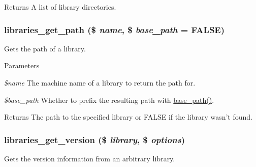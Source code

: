 \begin{DoxyReturn}{Returns}
A list of library directories. 
\end{DoxyReturn}
\hypertarget{libraries_8module_af6582ffdd6b230b9532c8fd007448b2e}{
\subsubsection[{libraries\_\-get\_\-path}]{\setlength{\rightskip}{0pt plus 5cm}libraries\_\-get\_\-path (\$ {\em name}, \/  \$ {\em base\_\-path} = {\ttfamily FALSE})}}
\label{libraries_8module_af6582ffdd6b230b9532c8fd007448b2e}
Gets the path of a library.


\begin{DoxyParams}{Parameters}
\item[{\em \$name}]The machine name of a library to return the path for. \item[{\em \$base\_\-path}]Whether to prefix the resulting path with \hyperlink{common_8inc_ae227697e9c239f09fd7e36f71afde771}{base\_\-path()}.\end{DoxyParams}
\begin{DoxyReturn}{Returns}
The path to the specified library or FALSE if the library wasn't found. 
\end{DoxyReturn}
\hypertarget{libraries_8module_a75db4e86addc3ceb4df8d0e1f5a54f99}{
\subsubsection[{libraries\_\-get\_\-version}]{\setlength{\rightskip}{0pt plus 5cm}libraries\_\-get\_\-version (\$ {\em library}, \/  \$ {\em options})}}
\label{libraries_8module_a75db4e86addc3ceb4df8d0e1f5a54f99}
Gets the version information from an arbitrary library.


